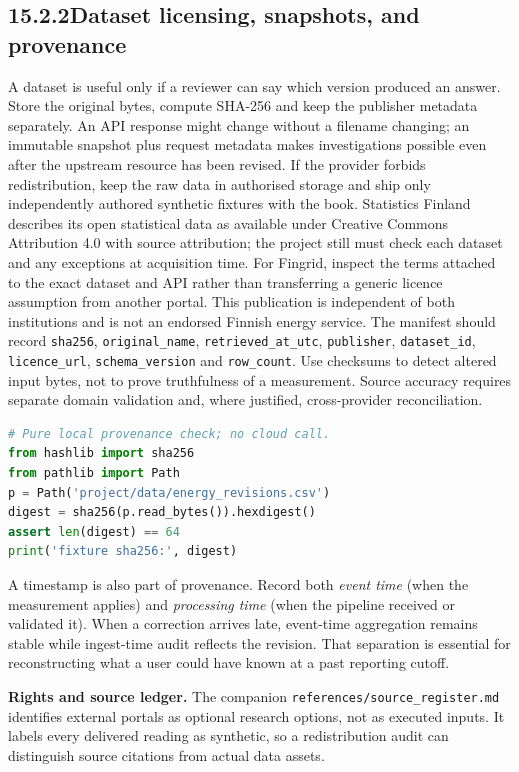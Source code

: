 \documentclass[11pt,twoside]{article}
\newcommand{\topic}[2]{\subsection*{#1\quad #2}}
\begin{document}
\newpage

\topic{15.2.2}{Dataset licensing, snapshots, and provenance}
A dataset is useful only if a reviewer can say which version produced an answer. Store the original bytes, compute SHA-256 and keep the publisher metadata separately. An API response might change without a filename changing; an immutable snapshot plus request metadata makes investigations possible even after the upstream resource has been revised. If the provider forbids redistribution, keep the raw data in authorised storage and ship only independently authored synthetic fixtures with the book.
Statistics Finland describes its open statistical data as available under Creative Commons Attribution 4.0 with source attribution; the project still must check each dataset and any exceptions at acquisition time. For Fingrid, inspect the terms attached to the exact dataset and API rather than transferring a generic licence assumption from another portal. This publication is independent of both institutions and is not an endorsed Finnish energy service.
The manifest should record \texttt{sha256}, \texttt{original\_name}, \texttt{retrieved\_at\_utc}, \texttt{publisher}, \texttt{dataset\_id}, \texttt{licence\_url}, \texttt{schema\_version} and \texttt{row\_count}. Use checksums to detect altered input bytes, not to prove truthfulness of a measurement. Source accuracy requires separate domain validation and, where justified, cross-provider reconciliation.
\begin{lstlisting}[language=Python]
# Pure local provenance check; no cloud call.
from hashlib import sha256
from pathlib import Path
p = Path('project/data/energy_revisions.csv')
digest = sha256(p.read_bytes()).hexdigest()
assert len(digest) == 64
print('fixture sha256:', digest)
\end{lstlisting}
A timestamp is also part of provenance. Record both \emph{event time} (when the measurement applies) and \emph{processing time} (when the pipeline received or validated it). When a correction arrives late, event-time aggregation remains stable while ingest-time audit reflects the revision. That separation is essential for reconstructing what a user could have known at a past reporting cutoff.
\begin{whitebox}\textbf{Rights and source ledger.} The companion \texttt{references/source\_register.md} identifies external portals as optional research options, not as executed inputs. It labels every delivered reading as synthetic, so a redistribution audit can distinguish source citations from actual data assets.\end{whitebox}
\end{document}
